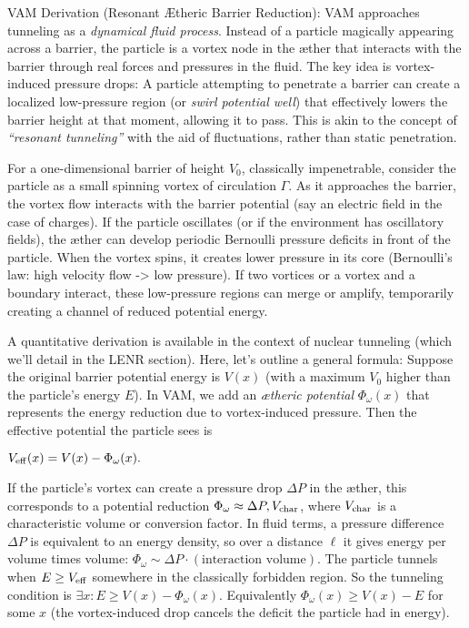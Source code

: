 \documentclass[a4paper, aps,preprint,superscriptaddress, 12pt]{revtex4}
\begin{document}
VAM Derivation (Resonant Ætheric Barrier Reduction): VAM approaches tunneling as a \textit{dynamical fluid process}. Instead of a particle magically appearing across a barrier, the particle is a vortex node in the æther that interacts with the barrier through real forces and pressures in the fluid. The key idea is vortex-induced pressure drops: A particle attempting to penetrate a barrier can create a localized low-pressure region (or \textit{swirl potential well}) that effectively lowers the barrier height at that moment, allowing it to pass. This is akin to the concept of \textit{“resonant tunneling”} with the aid of fluctuations, rather than static penetration.


For a one-dimensional barrier of height $V_0$, classically impenetrable, consider the particle as a small spinning vortex of circulation $\Gamma$. As it approaches the barrier, the vortex flow interacts with the barrier potential (say an electric field in the case of charges). If the particle oscillates (or if the environment has oscillatory fields), the æther can develop periodic Bernoulli pressure deficits in front of the particle. When the vortex spins, it creates lower pressure in its core (Bernoulli’s law: high velocity flow -> low pressure). If two vortices or a vortex and a boundary interact, these low-pressure regions can merge or amplify, temporarily creating a channel of reduced potential energy.


A quantitative derivation is available in the context of nuclear tunneling (which we’ll detail in the LENR section). Here, let’s outline a general formula: Suppose the original barrier potential energy is $V(x)$ (with a maximum $V_0$ higher than the particle’s energy $E$). In VAM, we add an \textit{ætheric potential} $\Phi_\omega(x)$ that represents the energy reduction due to vortex-induced pressure. Then the effective potential the particle sees is

$V_{\rm eff}(x) = V(x) - \Phi_\omega(x).$

If the particle’s vortex can create a pressure drop $\Delta P$ in the æther, this corresponds to a potential reduction $\Phi_\omega \approx \Delta P , V_{\rm char}$, where $V_{\rm char}$ is a characteristic volume or conversion factor. In fluid terms, a pressure difference $\Delta P$ is equivalent to an energy density, so over a distance $\ell$ it gives energy per volume times volume: $ \Phi_\omega \sim \Delta P \cdot (\text{interaction volume})$. The particle tunnels when $E \ge V_{\rm eff}$ somewhere in the classically forbidden region. So the tunneling condition is $\exists x: E \ge V(x) - \Phi_\omega(x)$. Equivalently $\Phi_\omega(x) \ge V(x) - E$ for some $x$ (the vortex-induced drop cancels the deficit the particle had in energy).
\end{document}
